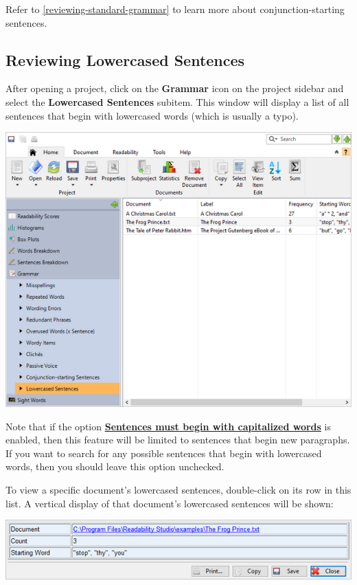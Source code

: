 \documentclass[
]{book}
\theoremstyle{definition}
\theoremstyle{definition}
\theoremstyle{definition}
\theoremstyle{definition}
\theoremstyle{remark}
\begin{document}
Refer to \ref{reviewing-standard-grammar} to learn more about conjunction-starting sentences.

\hypertarget{reviewing-batch-lowercased-sentences}{%
\subsection*{Reviewing Lowercased Sentences}\label{reviewing-batch-lowercased-sentences}}

After opening a project, click on the \textbf{Grammar} icon on the project sidebar and select the \textbf{Lowercased Sentences} subitem. This window will display a list of all sentences that begin with lowercased words (which is usually a typo).

\includegraphics{Images/batchlowersentences.png}

Note that if the option \protect\hyperlink{options-sentence-deduction}{\textbf{Sentences must begin with capitalized words}} is enabled, then this feature will be limited to sentences that begin new paragraphs. If you want to search for any possible sentences that begin with lowercased words, then you should leave this option unchecked.

To view a specific document's lowercased sentences, double-click on its row in this list. A vertical display of that document's lowercased sentences will be shown:

\includegraphics{Images/batchlowersentenceviewitem.png}
\end{document}
